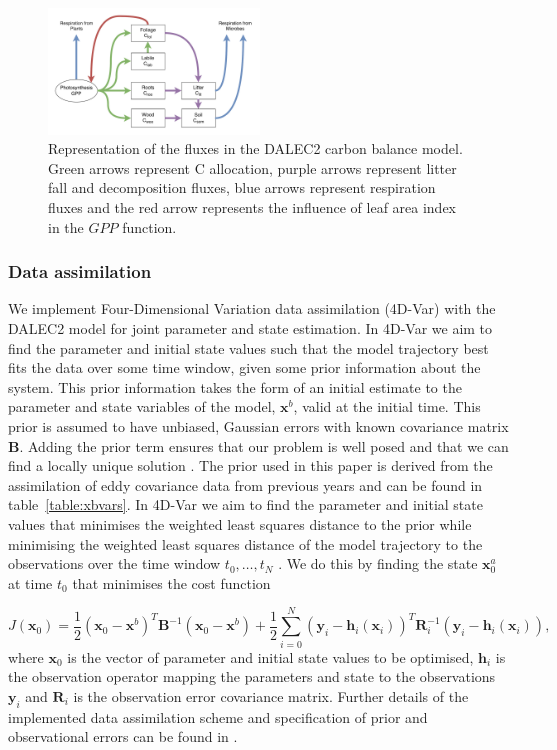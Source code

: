 \documentclass[11pt]{article}
\begin{document}
\begin{figure}[ht]
    \centering
    \includegraphics[width=0.5\textwidth]{dalec2diag.pdf}
    \caption{Representation of the fluxes in the DALEC2 carbon balance model. Green arrows represent C allocation, purple arrows represent litter fall and decomposition fluxes, blue arrows represent respiration fluxes and the red arrow represents the influence of leaf area index in the $GPP$ function.} \label{fig:DALEC_mod}
\end{figure}

\subsubsection{Data assimilation} \label{sec:da}

We implement Four-Dimensional Variation data assimilation (4D-Var) with the DALEC2 model for joint parameter and state estimation. In 4D-Var we aim to find the parameter and initial state values such that the model trajectory best fits the data over some time window, given some prior information about the system. This prior information takes the form of an initial estimate to the parameter and state variables of the model, $\textbf{x}^{b}$, valid at the initial time. This prior is assumed to have unbiased, Gaussian errors with known covariance matrix $\textbf{B}$. Adding the prior term ensures that our problem is well posed and that we can find a locally unique solution \citep{Tremolet2006}. The prior used in this paper is derived from the assimilation of eddy covariance data from previous years and can be found in table~\ref{table:xbvars}. In 4D-Var we aim to find the parameter and initial state values that minimises the weighted least squares distance to the prior while minimising the weighted least squares distance of the model trajectory to the observations over the time window $t_{0}, \dots, t_{N}$ \citep{lawless2013}. We do this by finding the state $\textbf{x}^{a}_{0}$ at time $t_{0}$ that minimises the cost function

\begin{equation}
J(\textbf{x}_0) = \frac{1}{2}(\textbf{x}_0-\textbf{x}^b)^{T}\textbf{B}^{-1}(\textbf{x}_0-\textbf{x}^b)+\frac{1}{2}\sum_{i=0}^{N}(\textbf{y}_i-\textbf{h}_i(\textbf{x}_i))^{T}\textbf{R}_{i}^{-1}(\textbf{y}_i-\textbf{h}_i(\textbf{x}_i)),
\end{equation}
where $\textbf{x}_{0}$ is the vector of parameter and initial state values to be optimised, $\textbf{h}_{i}$ is the observation operator mapping the parameters and state to the observations $\textbf{y}_{i}$ and $\textbf{R}_{i}$ is the observation error covariance matrix. Further details of the implemented data assimilation scheme and specification of prior and observational errors can be found in \citet{Pinnington2016299}. 
\end{document}

